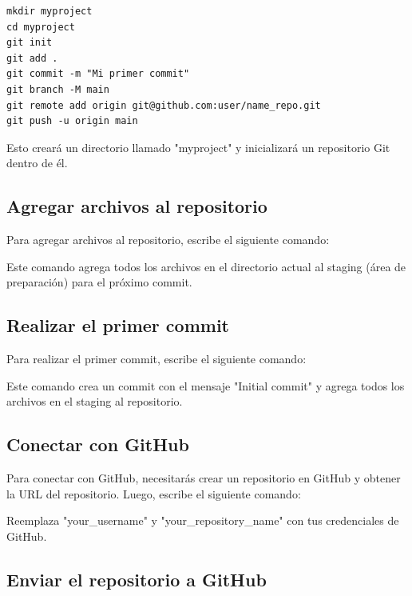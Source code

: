 \begin{terbox} 
\begin{verbatim}
mkdir myproject
cd myproject
git init
git add .
git commit -m "Mi primer commit"
git branch -M main 
git remote add origin git@github.com:user/name_repo.git
git push -u origin main
\end{verbatim}
\end{terbox} 

Esto creará un directorio llamado "myproject" y inicializará un repositorio Git dentro de él.




\subsection{Agregar archivos al repositorio}

Para agregar archivos al repositorio, escribe el siguiente comando: \begin{terbox} 
 

\end{terbox} 

Este comando agrega todos los archivos en el directorio actual al staging (área de preparación) para el próximo commit.

\subsection{Realizar el primer commit}

Para realizar el primer commit, escribe el siguiente comando: \begin{terbox} 

\end{terbox}

Este comando crea un commit con el mensaje "Initial commit" y agrega todos los archivos en el staging al repositorio.

\subsection{Conectar con GitHub}

Para conectar con GitHub, necesitarás crear un repositorio en GitHub y obtener la URL del repositorio. Luego, escribe el siguiente comando: 


Reemplaza "your\_username" y "your\_repository\_name" con tus credenciales de GitHub.

\subsection{Enviar el repositorio a GitHub}

